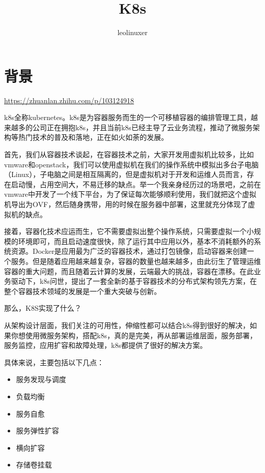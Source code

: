 \documentclass[12pt]{article}
\title{K8s}
\author{leolinuxer}
\begin{document}
\maketitle
\tableofcontents

\section{背景}
\url{https://zhuanlan.zhihu.com/p/103124918}

k8s全称kubernetes。k8s是为容器服务而生的一个可移植容器的编排管理工具，越来越多的公司正在拥抱k8s，并且当前k8s已经主导了云业务流程，推动了微服务架构等热门技术的普及和落地，正在如火如荼的发展。

首先，我们从容器技术谈起，在容器技术之前，大家开发用虚拟机比较多，比如vmware和openstack，我们可以使用虚拟机在我们的操作系统中模拟出多台子电脑（Linux），子电脑之间是相互隔离的，但是虚拟机对于开发和运维人员而言，存在启动慢，占用空间大，不易迁移的缺点。举一个我亲身经历过的场景吧，之前在vmware中开发了一个线下平台，为了保证每次能够顺利使用，我们就把这个虚拟机导出为OVF，然后随身携带，用的时候在服务器中部署，这里就充分体现了虚拟机的缺点。

接着，容器化技术应运而生，它不需要虚拟出整个操作系统，只需要虚拟一个小规模的环境即可，而且启动速度很快，除了运行其中应用以外，基本不消耗额外的系统资源。Docker是应用最为广泛的容器技术，通过打包镜像，启动容器来创建一个服务。但是随着应用越来越复杂，容器的数量也越来越多，由此衍生了管理运维容器的重大问题，而且随着云计算的发展，云端最大的挑战，容器在漂移。在此业务驱动下，k8s问世，提出了一套全新的基于容器技术的分布式架构领先方案，在整个容器技术领域的发展是一个重大突破与创新。

那么，K8S实现了什么？

从架构设计层面，我们关注的可用性，伸缩性都可以结合k8s得到很好的解决，如果你想使用微服务架构，搭配k8s，真的是完美，再从部署运维层面，服务部署，服务监控，应用扩容和故障处理，k8s都提供了很好的解决方案。

具体来说，主要包括以下几点：
\begin{itemize}
\setlength{\itemsep}{0pt}
\setlength{\parsep}{0pt}
\setlength{\parskip}{0pt}
    \item 服务发现与调度
    \item 负载均衡
    \item 服务自愈
    \item 服务弹性扩容
    \item 横向扩容
    \item 存储卷挂载
\end{itemize}
\end{document}
